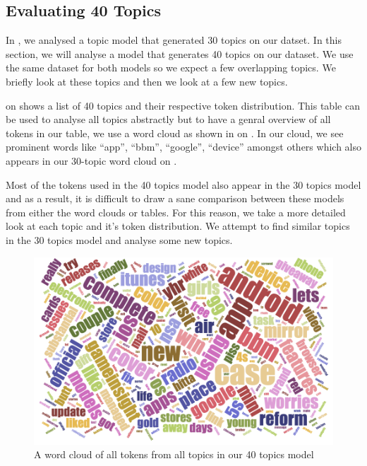 \subsection{Evaluating 40 Topics}
\label{sec:evaluating-40-topics}
In , we analysed a topic model that generated 30 topics on our
datset. In this section, we will analyse a model that generates 40 topics on our dataset. We use the
same dataset for both models so we expect a few overlapping topics. We briefly look at these topics
and then we look at a few new topics.

 on  shows a list of 40 topics and their respective
token distribution. This table can be used to analyse all topics abstractly but to have a genral
overview of all tokens in our table, we use a word cloud as shown in  on
. In our cloud, we see prominent words like ``app'', ``bbm'',
``google'', ``device'' amongst others which also appears in our 30-topic word cloud on
.

Most of the tokens used in the 40 topics model also appear in the 30 topics model and as a result, it is
difficult to draw a sane comparison between these models from either the word clouds or tables. For
this reason, we take a more detailed look at each topic and it's token distribution. We attempt to
find similar topics in the 30 topics model and analyse some new topics.\\

\begin{figure}
\begin{center}
  \includegraphics[scale=0.75,angle=90]{Figures/40_topics_cloud}
\end{center}
\caption{A word cloud of all tokens from all topics in our 40 topics model}
\label{fig:40-topics-cloud}
\end{figure}

